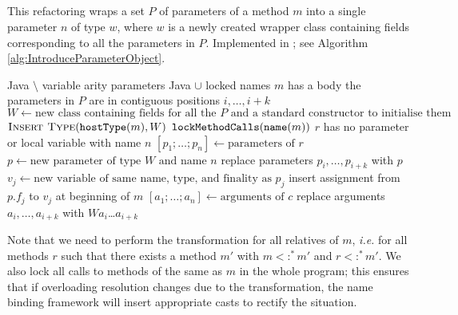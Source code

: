 \subsection{}
This refactoring wraps a set $P$ of parameters of a method $m$ into a single parameter $n$ of type $w$, where $w$ is a newly created wrapper class containing fields corresponding to all the parameters in $P$. Implemented in ; see Algorithm \ref{alg:IntroduceParameterObject}.

\begin{algorithm}
\caption{$\refactoring{Introduce Parameter Object}(m : \type{Method}, P : \settp{\type{Parameter}}, w : \settp{Name}, n : \settp{Name})$}
\label{alg:IntroduceParameterObject}
\begin{algorithmic}[1]
\REQUIRE Java $\setminus$ variable arity parameters
\ENSURE Java $\cup$ locked names
\medskip
\STATE \assert $m$ has a body
\STATE \assert the parameters in $P$ are in contiguous positions $i, \ldots, i+k$
\STATE $W \leftarrow \text{new class containing fields for all the $P$ and a standard constructor to initialise them}$
\STATE $\textsc{Insert Type}(\text{\texttt{hostType}}(m), W)$
\STATE $\text{\texttt{lockMethodCalls}}(\text{\texttt{name}}(m))$
  \STATE \assert $r$ has no parameter or local variable with name $n$
  \STATE $[p_1;\ldots;p_n] \leftarrow \text{parameters of $r$}$
  \STATE $p \leftarrow \text{new parameter of type $W$ and name $n$}$
  \STATE replace parameters $p_i, \ldots, p_{i+k}$ with $p$
    \STATE $v_j \leftarrow \text{new variable of same name, type, and finality as $p_j$}$
    \STATE insert assignment from $p.f_j$ to $v_j$ at beginning of $m$
  \ENDFOR
    \STATE $[a_1;\ldots;a_n] \leftarrow \text{arguments of $c$}$
    \STATE replace arguments $a_i, \ldots, a_{i+k}$ with $W$\code{(}$a_i$\code{,}\ldots\code{,}$a_{i+k}$\code{)}
  \ENDFOR
\ENDFOR
\end{algorithmic}
\end{algorithm}

Note that we need to perform the transformation for all relatives of $m$, \emph{i.e.} for all methods $r$ such that there exists a method $m'$ with $m<:^*m'$ and $r<:^*m'$. We also lock all calls to methods of the same as $m$ in the whole program; this ensures that if overloading resolution changes due to the transformation, the name binding framework will insert appropriate casts to rectify the situation.
